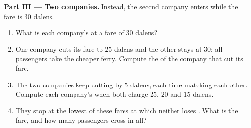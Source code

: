 \begin{problem}
\medskip
\noindent\textbf{Part III --- Two companies.} Instead, the second company enters while the fare is
$30$ dalens.
\begin{enumerate}[resume]
  \item What is each company's  at a fare of $30$ dalens?
  \item One company cuts its fare to $25$ dalens and the other stays at $30$: all passengers take the
        cheaper ferry. Compute the  of the company that cut its fare.
  \item The two companies keep cutting by $5$ dalens, each time matching each other. Compute each
        company's  when both charge $25$, $20$ and $15$ dalens.
  \item They stop at the lowest of these fares at which neither loses . What is the fare, and how
        many passengers cross in all?
\end{enumerate}
\end{problem}
